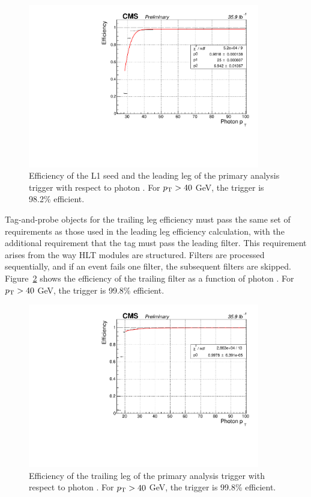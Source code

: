 \begin{figure}[h]
\begin{center}
\includegraphics[width=0.9\textwidth]{Figures/Trigger/leadingEff.pdf}
\end{center}
\caption{Efficiency of the L1 seed and the leading leg of the primary analysis trigger with respect to photon \pT. 
For $p_{\mathrm{T}} > 40$ GeV, the trigger is 98.2\% efficient.}
\label{fig:leadEff}
\end{figure}

Tag-and-probe objects for the trailing leg efficiency must pass the same set of requirements as those used in the leading leg efficiency calculation, with the additional requirement that the tag must pass the leading filter. This requirement arises from the way HLT modules are structured. Filters are processed sequentially, and if an event fails one filter, the subsequent filters are skipped. Figure~\ref{fig:trailEff} shows the efficiency of the trailing filter as a function of photon \pt. For $p_{\mathrm{T}} > 40$ GeV, the trigger is 99.8\% efficient.

\begin{figure}[h]
\begin{center}
\includegraphics[width=0.9\textwidth]{Figures/Trigger/trailingEff.pdf}
\end{center}
\caption{Efficiency of the trailing leg of the primary analysis trigger with respect to photon \pT. 
For $p_{\mathrm{T}} > 40$ GeV, the trigger is 99.8\% efficient.}
\label{fig:trailEff}
\end{figure}

